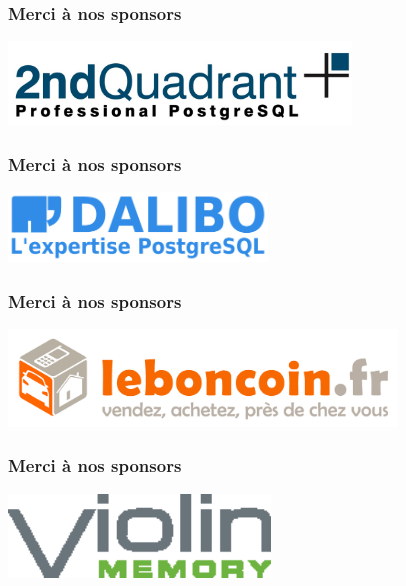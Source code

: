 \documentclass{beamer}
\begin{document}
\begin{frame}[fragile]
  \frametitle{Merci à nos sponsors}

  \begin{center}
    \includegraphics[height=6em]{2ndquadrant_logo_full_color.jpg}
  \end{center}
\end{frame}

\begin{frame}[fragile]
  \frametitle{Merci à nos sponsors}

  \begin{center}
    \includegraphics[height=5em]{logo_dalibo_large_blue.png}
  \end{center}
\end{frame}

\begin{frame}[fragile]
  \frametitle{Merci à nos sponsors}

  \begin{center}
    \includegraphics[height=7em]{LOGO_FINAL_VECTO.jpg}
  \end{center}
\end{frame}

\begin{frame}[fragile]
  \frametitle{Merci à nos sponsors}

  \begin{center}
    \includegraphics[height=6em]{VMLogoPMS.eps}
  \end{center}
\end{frame}
\end{document}
